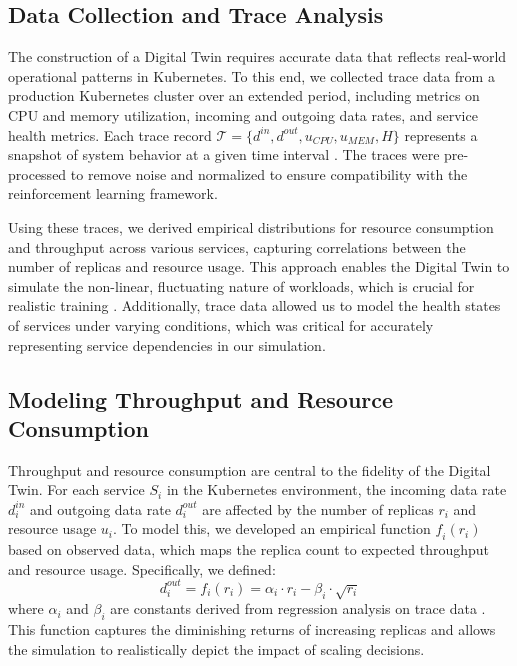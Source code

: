 \documentclass[conference]{IEEEtran}
\begin{document}
\subsection{Data Collection and Trace Analysis}

The construction of a Digital Twin requires accurate data that reflects real-world operational patterns in Kubernetes. To this end, we collected trace data from a production Kubernetes cluster over an extended period, including metrics on CPU and memory utilization, incoming and outgoing data rates, and service health metrics. Each trace record $\mathcal{T} = \{\mathit{d^{in}}, \mathit{d^{out}}, \mathit{u_{CPU}}, \mathit{u_{MEM}}, \mathit{H}\}$ represents a snapshot of system behavior at a given time interval \cite{park_predictive_scaling}. The traces were pre-processed to remove noise and normalized to ensure compatibility with the reinforcement learning framework.

Using these traces, we derived empirical distributions for resource consumption and throughput across various services, capturing correlations between the number of replicas and resource usage. This approach enables the Digital Twin to simulate the non-linear, fluctuating nature of workloads, which is crucial for realistic training \cite{nguyen_sim2reality}. Additionally, trace data allowed us to model the health states of services under varying conditions, which was critical for accurately representing service dependencies in our simulation.

\subsection{Modeling Throughput and Resource Consumption}

Throughput and resource consumption are central to the fidelity of the Digital Twin. For each service $S_i$ in the Kubernetes environment, the incoming data rate $\mathit{d_i^{in}}$ and outgoing data rate $\mathit{d_i^{out}}$ are affected by the number of replicas $\mathit{r_i}$ and resource usage $\mathit{u_i}$. To model this, we developed an empirical function $\mathit{f_i(r_i)}$ based on observed data, which maps the replica count to expected throughput and resource usage. Specifically, we defined:
\begin{equation}
    d_i^{out} = f_i(r_i) = \alpha_i \cdot r_i - \beta_i \cdot \sqrt{r_i}
\end{equation}
where $\alpha_i$ and $\beta_i$ are constants derived from regression analysis on trace data \cite{tan_nn_resource_approx}. This function captures the diminishing returns of increasing replicas and allows the simulation to realistically depict the impact of scaling decisions.
\end{document}
